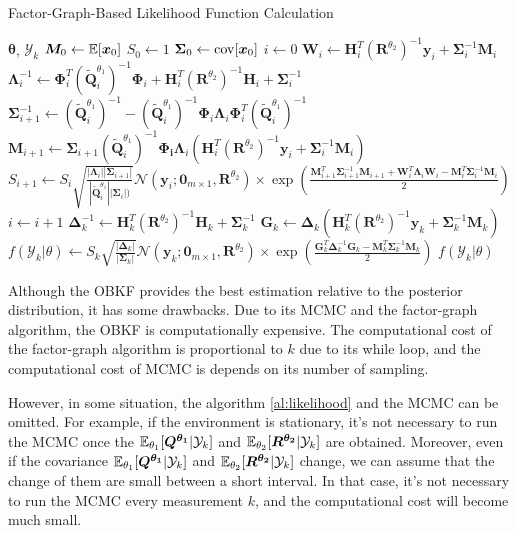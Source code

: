 \begin{algorithm}[H]
\caption{Factor-Graph-Based Likelihood Function Calculation}
\begin{algorithmic}[1]
    \label{al:likelihood}
\REQUIRE $\bm{\theta}$, $\mathcal{Y}_k$
\STATE $\bm{ M}_0 \leftarrow \mathbb{E}[\bm{ x}_0]$
\STATE $S_0 \leftarrow 1$
\STATE $\bm { \Sigma}_0 \leftarrow {\rm cov}[\bm{ x}_0]$
\STATE $i \leftarrow 0$
    \STATE $\bm{ W}_i\leftarrow \bm{ H}_i^T(\bm{ R}^{\theta_2})^{-1}\bm{ y}_i + \bm { \Sigma}_i^{-1}\bm{ M}_i$
    \STATE $\bm{ \Lambda}_i^{-1}\leftarrow \bm{ \Phi}_i^T(\bm{ \tilde Q}_i^{\theta_1})^{-1}\bm{ \Phi}_i + \bm{ H}_i^{T}(\bm{ R}^{\theta_2})^{-1}\bm{ H}_i+\bm { \Sigma}_i^{-1}$
    \STATE $\bm { \Sigma}_{i+1}^{-1}\leftarrow (\bm{ \tilde Q}_i^{\theta_1})^{-1} - (\bm{ \tilde Q}_i^{\theta_1})^{-1}\bm{ \Phi}_i\bm{ \Lambda}_i\bm{ \Phi}_i^T(\bm{ \tilde Q}_i^{\theta_1})^{-1}$
    \STATE $\bm{ M}_{i+1}\leftarrow \bm { \Sigma}_{i+1}(\bm{ \tilde Q}_i^{\theta_1})^{-1}\bm{ \Phi_i}\bm{ \Lambda}_i(\bm{ H}_i^T(\bm{ R}^{\theta_2})^{-1}\bm{ y}_i+\bm { \Sigma}_i^{-1}\bm{ M}_i)$
    \STATE $S_{i+1} \leftarrow S_i\sqrt{\frac{|\bm{\Lambda}_i||\bm{\Sigma}_{i+1}|}{|\bm{ \tilde Q}_i^{\theta_1}||\bm{\Sigma}_i|)}}\mathcal{N}(\bm{y}_i;\bm{0}_{m\times1},\bm{R}^{{\theta}_2})\times\exp(\frac{\bm{M}^T_{i+1}\bm{\Sigma}^{-1}_{i+1}\bm{M}_{i+1}+\bm{W}^T_{i}\bm{\Lambda}_{i}\bm{W}_{i}-\bm{M}^T_{i}\bm{\Sigma}^{-1}_{i}\bm{M}_{i}}{2})$
    \STATE $i \leftarrow i+1$
\ENDWHILE
\STATE $\bm{ \Delta}_k^{-1}\leftarrow \bm{ H}_k^T(\bm{ R}^{\theta_2})^{-1}\bm{ H}_k + \bm { \Sigma}_k^{-1}$
\STATE $\bm{ G}_k \leftarrow \bm{ \Delta}_k(\bm{ H}_k^T(\bm{ R}^{\theta_2})^{-1}\bm{ y}_k + \bm { \Sigma}_k^{-1}\bm{ M}_k)$
\STATE $f(\mathcal{Y}_k|\theta) \leftarrow S_k\sqrt{\frac{|\bm{\Delta}_k|}{|\bm{\Sigma}_k|}}\mathcal{N}(\bm{y}_k;\bm {0}_{m\times 1}, \bm{R}^{{\theta}_2})\times \exp(\frac{\bm{G}^T_{k}\bm{\Delta}^{-1}_{k}\bm{G}_{k}-\bm{M}^T_{k}\bm{\Sigma}^{-1}_{k}\bm{M}_{k}}{2})$
\ENSURE $f(\mathcal{Y}_k|\theta)$
\end{algorithmic}
\end{algorithm}

Although the OBKF provides the best estimation relative to the posterior distribution, it has some drawbacks. Due to its MCMC and the factor-graph algorithm, the OBKF is computationally expensive. The computational cost of the factor-graph algorithm is proportional to $k$ due to its while loop, and the computational cost of MCMC is depends on its number of sampling. 

However, in some situation, the algorithm \ref{al:likelihood} and the MCMC can be omitted. For example, if the environment is stationary, it's not necessary to run the MCMC once the $\mathbb{E}_{\theta_1}[\bm {Q^{\theta_1}}|\mathcal{Y}_k]$ and $\mathbb{E}_{\theta_2}[\bm{R^{\theta_2}}|\mathcal{Y}_k]$ are obtained. 
Moreover, even if the covariance $\mathbb{E}_{\theta_1}[\bm {Q^{\theta_1}}|\mathcal{Y}_k]$ and $\mathbb{E}_{\theta_2}[\bm{R^{\theta_2}}|\mathcal{Y}_k]$ change, we can assume that the change of them are small between a short interval. In that case, it's not necessary to run the MCMC every measurement $k$, and the computational cost will become much small.
